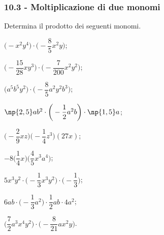 \subsubsection*{10.3 - Moltiplicazione di due monomi}

\begin{esercizio}[\Ast]
 \label{ese:10.12} %
Determina il prodotto dei seguenti monomi.
\begin{multicols}{2}
\begin{enumeratea}
\spazielenx
 \item $\big(-x^{2}y^{4}\big)\cdot \bigg(-{\dfrac{8}{5}}x^{2}y\bigg)$;
 \item $\bigg(-{\dfrac{15}{28}}xy^{3}\bigg)\cdot\bigg(-\dfrac{7}{200}x^{2}y^{2}\bigg)$;
 \item $\big(a^{5}b^{5}y^{2}\big)\cdot\bigg(-\dfrac{8}{5}a^{2}y^{2}b^{3}\bigg)$;
 \item $\np{2,5}ab^{2}\cdot \bigg(-{\dfrac{1}{2}}a^{2}b\bigg)\cdot \np{1,5}a$;
 \item $\bigg(-{\dfrac{2}{9}}xz\bigg)\bigg(-{\dfrac{1}{4}}z^{3}\bigg)(27x)$;
 \item $-8\bigg(\dfrac{1}{4}x\bigg)\bigg(\dfrac{4}{5}x^{3}a^{4}\bigg)$;
 \item $5x^{3}y^{2}\cdot \bigg(-{\dfrac{1}{3}}x^{3}y^{2}\bigg)\cdot \bigg(-{\dfrac{1}{3}}\bigg)$;
 \item $6ab\cdot \bigg(-{\dfrac{1}{3}}a^{2}\bigg)\cdot {\dfrac{1}{2}ab\cdot 4a^{2}}$;
 \item $\bigg(\dfrac{7}{2}a^{3}x^{{4}}y^{2}\bigg)\cdot \bigg(-{\dfrac{8}{21}}ax^{2}y\bigg)$.
\end{enumeratea}
\end{multicols}
\end{esercizio}

